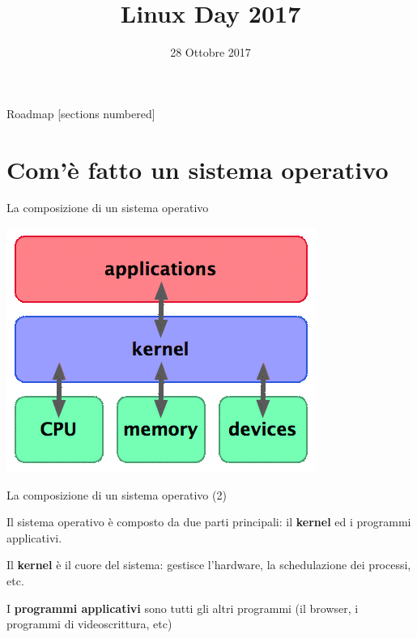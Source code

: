 \documentclass[10pt]{beamer}
\title{Linux Day 2017}
\subtitle{}
\date{28 Ottobre 2017}
\author{}
\institute{Latina Linux User Group}
\begin{document}
\setlength{\columnsep}{15pt}


\maketitle

\begin{frame}{Roadmap}
  [sections numbered]
  \tableofcontents[hideallsubsections]
\end{frame}


\section{Com'è fatto un sistema operativo}

\begin{frame}{La composizione di un sistema operativo}

\centering \includegraphics[scale=0.5]{kernel}

\end{frame}

\begin{frame}{La composizione di un sistema operativo (2)}

Il sistema operativo è composto da due parti principali: il \textbf{kernel} ed i programmi applicativi.

Il \textbf{kernel} è il cuore del sistema: gestisce l'hardware, la schedulazione dei processi, etc.

I \textbf{programmi applicativi} sono tutti gli altri programmi (il browser, i programmi di videoscrittura, etc)

\end{frame}
\end{document}
